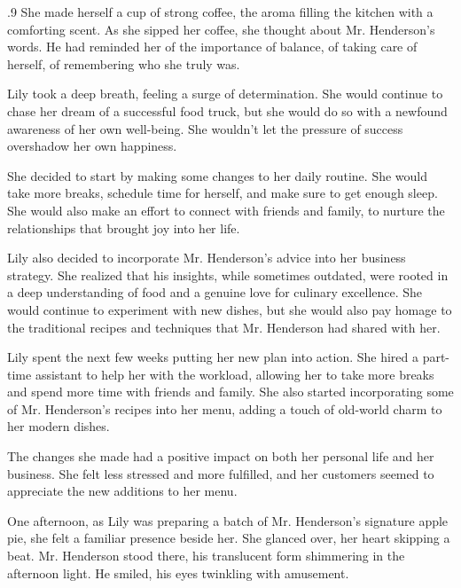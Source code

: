 \documentclass{article}
\newcommand{\Agentsroomzs}{\textsc{Agents' Room$_{ZS}$}}
\begin{document}
\begin{tcolorbox}[colback=white, colframe=gray!30!white, coltitle=black, parskip=5mm, title=
    \textbf{System output: \Agentsroomzs}, breakable]
\begin{spacing}{.9}
She made herself a cup of strong coffee, the aroma filling the kitchen with a comforting scent. As she sipped her coffee, she thought about Mr. Henderson's words. He had reminded her of the importance of balance, of taking care of herself, of remembering who she truly was.\\\par

Lily took a deep breath, feeling a surge of determination. She would continue to chase her dream of a successful food truck, but she would do so with a newfound awareness of her own well-being. She wouldn't let the pressure of success overshadow her own happiness.\\\par

She decided to start by making some changes to her daily routine. She would take more breaks, schedule time for herself, and make sure to get enough sleep. She would also make an effort to connect with friends and family, to nurture the relationships that brought joy into her life.\\\par

Lily also decided to incorporate Mr. Henderson's advice into her business strategy. She realized that his insights, while sometimes outdated, were rooted in a deep understanding of food and a genuine love for culinary excellence. She would continue to experiment with new dishes, but she would also pay homage to the traditional recipes and techniques that Mr. Henderson had shared with her.\\\par

Lily spent the next few weeks putting her new plan into action. She hired a part-time assistant to help her with the workload, allowing her to take more breaks and spend more time with friends and family. She also started incorporating some of Mr. Henderson's recipes into her menu, adding a touch of old-world charm to her modern dishes.\\\par

The changes she made had a positive impact on both her personal life and her business. She felt less stressed and more fulfilled, and her customers seemed to appreciate the new additions to her menu.\\\par

One afternoon, as Lily was preparing a batch of Mr. Henderson's signature apple pie, she felt a familiar presence beside her.  She glanced over, her heart skipping a beat. Mr. Henderson stood there, his translucent form shimmering in the afternoon light. He smiled, his eyes twinkling with amusement.\\\par


\end{spacing}
\end{tcolorbox}
\end{document}
